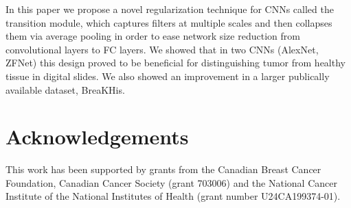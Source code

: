 \documentclass[runningheads,a4paper]{llncs}
\begin{document}
In this paper we propose a novel regularization technique for CNNs called the transition module, which captures filters at multiple scales and then collapses them via average pooling in order to ease network size reduction from convolutional layers to FC layers. We showed that in two CNNs (AlexNet, ZFNet) this design proved to be beneficial for distinguishing tumor from healthy tissue in digital slides. We also showed an improvement in a larger publically available dataset, BreaKHis. 

\section*{Acknowledgements}
This work has been supported by grants from the Canadian Breast Cancer Foundation, Canadian Cancer Society (grant 703006) and the National Cancer Institute of the National Institutes of Health (grant number U24CA199374-01). 



\end{document}
